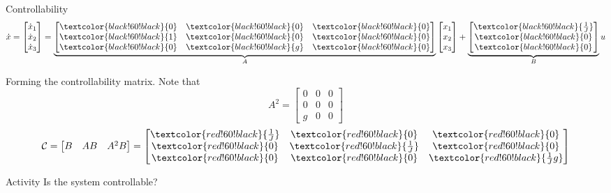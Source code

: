 \documentclass[presentation,aspectratio=169]{beamer}
\begin{document}
\begin{frame}[label={sec:org360de65}]{Controllability}
\[ \dot{x} = \begin{bmatrix} \dot{x}_1\\\dot{x}_2\\\dot{x}_3\end{bmatrix} = \underbrace{\begin{bmatrix} \textcolor{black!60!black}{0} & \textcolor{black!60!black}{0} &\textcolor{black!60!black}{0} \\\textcolor{black!60!black}{1} & \textcolor{black!60!black}{0}& \textcolor{black!60!black}{0}\\ \textcolor{black!60!black}{0}& \textcolor{black!60!black}{g} &\textcolor{black!60!black}{0} \end{bmatrix}}_{A} \begin{bmatrix} x_1\\x_2\\x_3\end{bmatrix} + \underbrace{\begin{bmatrix} \textcolor{black!60!black}{\frac{1}{J}} \\ \textcolor{black!60!black}{0} \\\textcolor{black!60!black}{0}  \end{bmatrix}}_{B} u \]

Forming the controllability matrix. Note that
\[ A^2 = \begin{bmatrix} 0 &  0 & 0\\ 0 & 0 & 0\\ g & 0 & 0 \end{bmatrix} \]
\[ \mathcal{C} = \begin{bmatrix} B & AB & A^2B\end{bmatrix}
   = \begin{bmatrix} \textcolor{red!60!black}{\frac{1}{J}} & \textcolor{red!60!black}{0} & \textcolor{red!60!black}{0}\\\textcolor{red!60!black}{0} & \textcolor{red!60!black}{\frac{1}{J}} & \textcolor{red!60!black}{0} \\\textcolor{red!60!black}{0} & \textcolor{red!60!black}{0} & \textcolor{red!60!black}{\frac{1}{J}g} \end{bmatrix} \]

\pause
\alert{Activity} Is the system controllable?
\end{frame}
\end{document}
